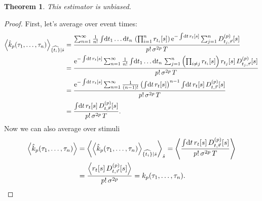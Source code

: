 \documentclass[12pt]{article}
\theoremstyle{slplain}
\newtheorem{thm}{Theorem}
\theoremstyle{sldefinition}
\theoremstyle{remark}
\begin{document}
\begin{thm}
  This estimator is unbiased.
\end{thm}
\begin{proof}
  First, let's average over event times:
  \begin{equation*}
    \begin{aligned}
      \av{\hat{k}_p(\tau_1,\ldots,\tau_n)}_{\widehat{\{t_i\}}|\hat{s}}  &=
        \frac{\sum_{n=1}^\infty  \frac{1}{n!} \intd{t_1\ldots\dr t_n} \prn{\prod_{i=1}^n r_{t_i}[s]} \e^{-\intd{t}r_t[s]} \sum_{j=1}^n D\rp{p}_{t_j,\vec{\tau}}[s] }{ p! \, \sigma^{2p} \, T } \\
        &= \frac{\e^{-\intd{t}r_t[s]} \sum_{n=1}^\infty  \frac{1}{n!} \intd{t_1\ldots\dr t_n} \sum_{j=1}^n \prn{\prod_{i\neq j} r_{t_i}[s]} r_{t_j}[s] \, D\rp{p}_{t_j,\vec{\tau}}[s] }{ p! \, \sigma^{2p} \, T } \\
        &= \frac{\e^{-\intd{t}r_t[s]} \sum_{n=1}^\infty  \frac{1}{(n-1)!}  \prn{\intd{t} r_{t}[s]}^{n-1} \intd{t} r_{t}[s] \, D\rp{p}_{t,\vec{\tau}}[s] }{ p! \, \sigma^{2p} \, T } \\
        &= \frac{ \intd{t} r_{t}[s] \, D\rp{p}_{t,\vec{\tau}}[s] }{ p! \, \sigma^{2p} \, T } .
    \end{aligned}
  \end{equation*}
  Now we can also average over stimuli
  \begin{equation*}
    \begin{aligned}
      \left\langle \hat{k}_p(\tau_1,\ldots,\tau_n) \right\rangle  &= 
        \left\langle  \left\langle \hat{k}_p(\tau_1,\ldots,\tau_n) \right\rangle_{\widehat{\{t_i\}}|\hat{s}}  \right\rangle_{\hat{s}} 
        = \left\langle  \frac{ \int\!\mathrm{d} t\, r_{t}[s] \, D^{(p)}_{t,\vec{\tau}}[s] }{ p! \, \sigma^{2p} \, T }  \right\rangle \\
        &=  \frac{ \left\langle  r_{t}[s] \, D^{(p)}_{t,\vec{\tau}}[s]  \right\rangle }{ p! \, \sigma^{2p}  }  
        = k_p(\tau_1,\ldots,\tau_n).
    \end{aligned}
  \end{equation*}
\end{proof}












\end{document}
